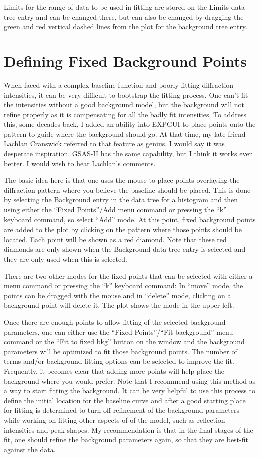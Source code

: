 Limits for the range of data to be used in fitting are stored on the Limits data tree entry and can be changed there, but can also be changed by dragging the green and red vertical dashed  lines from the plot for the background tree entry.

\section{Defining Fixed Background Points}
\label{ref:fixedbackground}
When faced with a complex baseline function and poorly-fitting diffraction intensities, it can be very difficult to bootstrap the fitting process. One can't fit the intensities without a good background model, but the background will not refine properly as it is compensating for all the badly fit intensities. To address this, some decades back, I added an ability into EXPGUI to place points onto the pattern to guide where the background should go. At that time, my late friend Lachlan Cranswick referred to that feature as genius.  I would say it was desperate inspiration. GSAS-II has the same capability, but I think it works even better. I would wish to hear Lachlan's comments. 

The basic idea here is that one uses the mouse to place points overlaying the diffraction pattern where you believe the baseline should be placed. This is done by selecting the Background entry in the data tree for a histogram and then using either the ``Fixed Points''/Add menu command or pressing the ``k'' keyboard command, so select ``Add'' mode. At this point, fixed background points are added to the plot by clicking on the pattern where those points should be located. Each point will be shown as a red diamond. Note that these red diamonds are only shown when the Background data tree entry is selected and they are only used when this is selected. 

There are two other modes for the fixed points that can be selected with either a menu command or pressing the ``k'' keyboard command: In ``move'' mode, the points can be dragged with the mouse and in ``delete'' mode, clicking on a background point will delete it. The plot shows the mode in the upper left. 

Once there are enough points to allow fitting of the selected background parameters, one can either use the ``Fixed Points''/``Fit background'' menu command or the ``Fit to fixed bkg'' button on the window and the background parameters will be optimized to fit those background points. The number of terms and/or background fitting options can be selected to improve the fit. Frequently, it becomes clear that adding more points will help place the background where you would prefer. Note that I recommend using this method as a way to start fitting the background. It can be very helpful to use this process to define the initial location for the baseline curve and after a good starting place for fitting is determined to turn off refinement of the background parameters while working on fitting other aspects of of the model, such as reflection intensities and peak shapes. My recommendation is that in the final stages of the fit, one should refine the background parameters again, so that they are best-fit against the data. 

